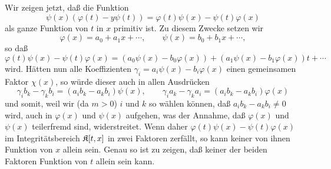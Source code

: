 Wir zeigen jetzt, daß die Funktion
\[
\psi(x)(\varphi(t)-y\psi(t))=\varphi(t)\psi(x)-\psi(t)\varphi(x)
\]
als ganze Funktion von \(t\) in \(x\) primitiv ist. Zu diesem Zwecke setzen wir
\[
\varphi(x)=a_0+a_1x+\cdots,\qquad \psi(x)=b_0+b_1x+\cdots,
\]
so daß
\[
\varphi(t)\psi(x)-\psi(t)\varphi(x)=(a_0\psi(x)-b_0\varphi(x))+(a_1\psi(x)-b_1\varphi(x))t+\cdots
\]
wird. Hätten nun alle Koeffizienten \(\gamma_i=a_i\psi(x)-b_i\varphi(x)\) einen gemeinsamen Faktor \(\chi(x)\), so würde dieser auch in allen Ausdrücken
\[
\gamma_i b_k-\gamma_k b_i=(a_i b_k-a_k b_i)\psi(x),
\qquad
\gamma_i a_k-\gamma_k a_i=(a_i b_k-a_k b_i)\varphi(x)
\]
und somit, weil wir (da \(m>0\)) \(i\) und \(k\) so wählen können, daß \(a_i b_k-a_k b_i\neq0\) wird, auch in \(\varphi(x)\) und \(\psi(x)\) aufgehen, was der Annahme, daß \(\varphi(x)\) und \(\psi(x)\) teilerfremd sind, widerstreitet. Wenn daher \(\varphi(t)\psi(x)-\psi(t)\varphi(x)\) im Integritätsbereich \(\mathfrak K[t,x]\) in zwei Faktoren zerfällt, so kann keiner von ihnen Funktion von \(x\) allein sein. Genau so ist zu zeigen, daß keiner der beiden Faktoren Funktion von \(t\) allein sein kann.

